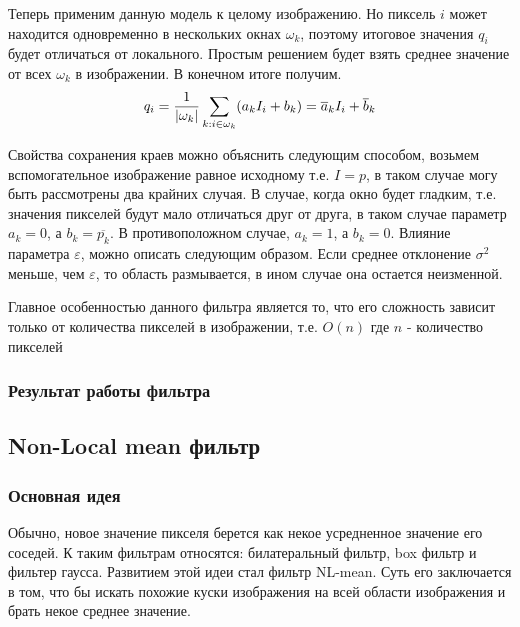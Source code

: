 Теперь применим данную модель к целому изображению. Но пиксель $i$ может находится одновременно в нескольких окнах $\omega_k$, поэтому итоговое значения $q_i$ будет отличаться от локального. Простым решением будет взять среднее значение от всех $\omega_k$ в изображении. В конечном итоге получим.
\begin{equation}
	q_i=\frac{1}{|\omega_k|}\sum_{k:i\in \omega_k}(a_kI_i+b_k)\\
	= \overline{a}_kI_i+\overline{b}_k
\end{equation}


Свойства сохранения краев можно объяснить следующим способом, возьмем вспомогательное изображение равное исходному т.е. $I=p$, в таком случае могу быть рассмотрены два крайних случая.
В случае, когда  окно будет гладким, т.е. значения пикселей будут мало отличаться друг от друга, в таком случае параметр $a_k=0$, а $b_k=\overline{p_k}$. 
В противоположном случае, $a_k=1$, а $b_k=0$.
Влияние параметра $\varepsilon$, можно описать следующим образом. Если среднее отклонение $\sigma^2$ меньше, чем $\varepsilon$, то область размывается, в ином случае она остается неизменной.

Главное особенностью данного фильтра является то, что его сложность зависит только от количества пикселей в изображении, т.е. $O(n)$ где $n$ - количество пикселей
\subsubsection{Результат работы фильтра}

\begin{figure}[H]\label{img:guidRes}
	\begin{minipage}[H]{0.49\linewidth}
	\end{minipage}
	\begin{minipage}[H]{0.49\linewidth}
	\end{minipage}
\end{figure}

\subsection{Non-Local mean фильтр}
\subsubsection{Основная идея}
Обычно, новое значение пикселя берется как некое усредненное значение его соседей. К таким фильтрам относятся: билатеральный фильтр, box фильтр и фильтер гаусса. Развитием этой идеи стал фильтр NL-mean. Суть его заключается в том, что бы искать похожие куски изображения на всей области изображения и брать некое среднее значение. 
